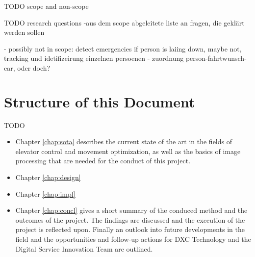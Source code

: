TODO scope and non-scope

TODO research questions
-aus dem scope abgeleitete liste an fragen, die geklärt werden sollen

- possibly not in scope: detect emergencies if person is laiing down, maybe not, tracking und idetifizeirung einzelnen persoenen
- zuordnung person-fahrtwunsch-car, oder doch?


\section{Structure of this Document}

TODO

\begin{itemize}
    \item Chapter \ref{chap:sota} describes the current state of the art in the fields of elevator control and movement optimization, as well as the basics of image processing that are needed for the conduct of this project.
    \item Chapter \ref{chap:design} 
    \item Chapter \ref{chap:impl}
    \item Chapter \ref{chap:concl} gives a short summary of the conduced method and the outcomes of the project. The findings are discussed and the execution of the project is reflected upon. Finally an outlook into future developments in the field and the opportunities and follow-up actions for DXC Technology and the Digital Service Innovation Team are outlined.
\end{itemize}
